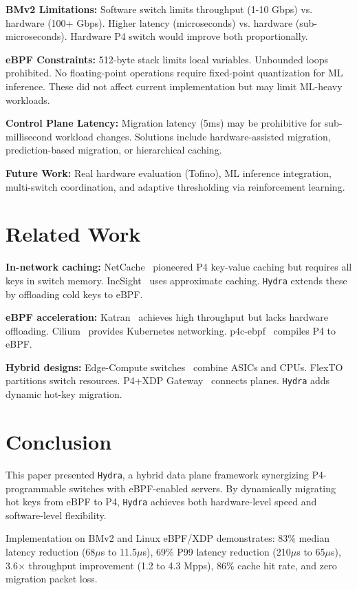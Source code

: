\documentclass[sigconf,anonymous,10pt]{acmart}
\newcommand{\hydra}{\texttt{Hydra}}
\begin{document}
\textbf{BMv2 Limitations:} Software switch limits throughput (1-10 Gbps) vs. hardware (100+ Gbps). Higher latency (microseconds) vs. hardware (sub-microseconds). Hardware P4 switch would improve both proportionally.

\textbf{eBPF Constraints:} 512-byte stack limits local variables. Unbounded loops prohibited. No floating-point operations require fixed-point quantization for ML inference. These did not affect current implementation but may limit ML-heavy workloads.

\textbf{Control Plane Latency:} Migration latency (5ms) may be prohibitive for sub-millisecond workload changes. Solutions include hardware-assisted migration, prediction-based migration, or hierarchical caching.

\textbf{Future Work:} Real hardware evaluation (Tofino), ML inference integration, multi-switch coordination, and adaptive thresholding via reinforcement learning.

\section{Related Work}
\label{sec:related}

\textbf{In-network caching:} NetCache~\cite{netcache} pioneered P4 key-value caching but requires all keys in switch memory. IncSight~\cite{incsight} uses approximate caching. \hydra{} extends these by offloading cold keys to eBPF.

\textbf{eBPF acceleration:} Katran~\cite{katran} achieves high throughput but lacks hardware offloading. Cilium~\cite{cilium} provides Kubernetes networking. p4c-ebpf~\cite{p4c-ebpf} compiles P4 to eBPF.

\textbf{Hybrid designs:} Edge-Compute switches~\cite{edgecompute} combine ASICs and CPUs. FlexTO~\cite{flexto} partitions switch resources. P4+XDP Gateway~\cite{p4xdp} connects planes. \hydra{} adds dynamic hot-key migration.

\section{Conclusion}
\label{sec:conclusion}

This paper presented \hydra{}, a hybrid data plane framework synergizing P4-programmable switches with eBPF-enabled servers. By dynamically migrating hot keys from eBPF to P4, \hydra{} achieves both hardware-level speed and software-level flexibility.

Implementation on BMv2 and Linux eBPF/XDP demonstrates: 83\% median latency reduction (68$\mu$s to 11.5$\mu$s), 69\% P99 latency reduction (210$\mu$s to 65$\mu$s), 3.6$\times$ throughput improvement (1.2 to 4.3 Mpps), 86\% cache hit rate, and zero migration packet loss.
\end{document}
